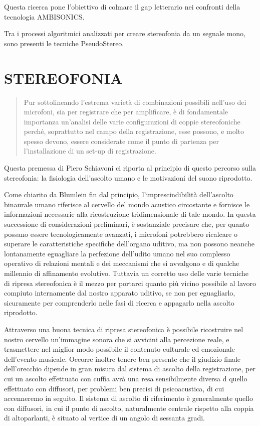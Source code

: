 Questa ricerca pone l'obiettivo di colmare il gap letterario nei confronti
della tecnologia AMBISONICS.

Tra i processi algoritmici analizzati per creare stereofonia da un segnale mono,
sono presenti le tecniche PseudoStereo.
\section*{STEREOFONIA}
\begin{quote}
Pur sottolineando l’estrema varietà di combinazioni possibili nell’uso dei
microfoni, sia per registrare che per amplificare, è di fondamentale importanza
un’analisi delle varie configurazioni di coppie stereofoniche perché,
soprattutto nel campo della registrazione, esse possono, e molto spesso devono,
essere considerate come il punto di partenza per l’installazione di un set-up
di registrazione.
\end{quote}

Questa premessa di Piero Schiavoni ci riporta al principio di questo percorso
sulla stereofonia: la fisiologia dell'ascolto umano e le motivazioni del suono
riprodotto.

Come chiarito da Blumlein \cite{ab58} fin dal principio, l'imprescindibilità
dell'ascolto binaurale umano riferisce al cervello del mondo acustico circostante
e fornisce le informazioni necessarie alla ricostruzione tridimensionale di tale
mondo. In questa successione di considerazioni preliminari, è sostanziale
precisare che, per quanto possano essere tecnologicamente avanzati, i microfoni
potrebbero ricalcare o superare le caratteristiche specifiche dell'organo uditivo,
ma non possono neanche lontanamente eguagliare la perfezione dell’udito umano
nel suo complesso operativo di relazioni mentali e dei meccanismi che si
avvalgono e di qualche millennio di affinamento evolutivo. Tuttavia un
corretto uso delle varie tecniche di ripresa stereofonica è il mezzo per
portarci quanto più vicino possibile al lavoro compiuto internamente dal nostro
apparato uditivo, se non per eguagliarlo, sicuramente per comprenderlo nelle
fasi di ricerca e appagarlo nella ascolto riprodotto.

Attraverso una buona tecnica di ripresa stereofonica è possibile ricostruire nel
nostro cervello un’immagine sonora che si avvicini alla percezione reale, e
trasmettere nel miglior modo possibile il contenuto culturale ed emozionale
dell’evento musicale. Occorre inoltre tenere ben presente che il giudizio finale
dell’orecchio dipende in gran misura dal sistema di ascolto della registrazione,
per cui un ascolto effettuato con cuffia avrà una resa sensibilmente diversa d
quello effettuato con diffusori, per problemi ben precisi di psicoacustica, di
cui accenneremo in seguito. Il sistema di ascolto di riferimento è generalmente
quello con diffusori, in cui il punto di ascolto, naturalmente centrale rispetto
alla coppia di altoparlanti, è situato al vertice di un angolo di sessanta gradi.

